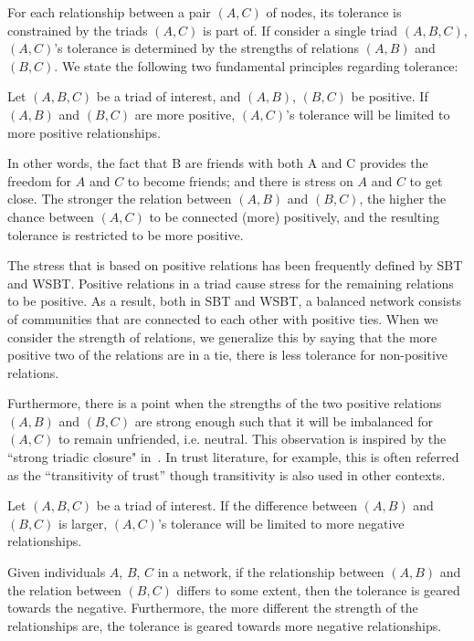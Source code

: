  For each relationship between a pair $(A,C)$ of nodes, its tolerance is constrained by the triads
$(A,C)$ is part of. If consider a single triad $(A,B,C)$, $(A,C)$'s tolerance is determined by the strengths of relations $(A,B)$ and $(B,C)$. We state the following two fundamental principles regarding tolerance:
\begin{principle}
Let $(A,B,C)$ be a triad of interest, and $(A,B)$, $(B,C)$ be positive. If $(A,B)$ and $(B,C)$ are more positive, $(A,C)$'s tolerance will be limited to more positive relationships.
\end{principle}
In other words, the fact that B are friends with both A and C provides
the freedom for $A$ and $C$ to become friends; and there is stress on
$A$ and $C$ to get close. The stronger the relation between $(A,B)$
and $(B,C)$, the higher the chance between $(A,C)$ to be connected
(more) positively, and the resulting tolerance is restricted to be
more positive.

The stress that is based on positive relations has been frequently
defined by SBT and WSBT. Positive relations in a triad cause stress
for the remaining relations to be positive. As a result, both in SBT
and WSBT, a balanced network consists of communities that are
connected to each other with positive ties. When we consider the
strength of relations, we generalize this by saying that the more
positive two of the relations are in a tie, there is less tolerance
for non-positive relations.

Furthermore, there is a point when the strengths of the two positive relations $(A,B)$ and $(B,C)$ are
strong enough such that it will be imbalanced for $(A,C)$ to remain
unfriended, i.e. neutral. This observation is inspired by the ``strong
triadic closure" in~\cite{Granovetter:1973}. In trust literature, for example, this is
often referred as the ``transitivity of trust'' though transitivity is
also used in other contexts.
\begin{principle}  
Let $(A,B,C)$ be a triad of interest. If the difference between $(A,B)$ and $(B,C)$ is larger, $(A,C)$'s tolerance will be limited to more negative relationships.
\end{principle}
Given individuals $A$, $B$, $C$ in a network, if the relationship
between $(A,B)$ and the relation between $(B,C)$ differs to some
extent, then the tolerance is geared towards the
negative. Furthermore, the more different the strength of the
relationships are, the tolerance is geared towards more
negative relationships. 

